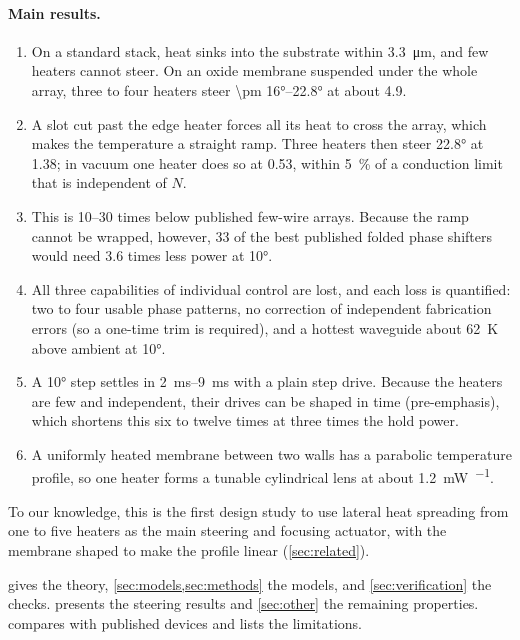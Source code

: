 \paragraph{Main results.}
\begin{enumerate}
  \item On a standard stack, heat sinks into the substrate within \qty{3.3}{\micro\metre}, and few heaters cannot
        steer. On an oxide membrane suspended under the whole array, three to four heaters steer
        \ang{\pm 16}--\ang{22.8} at about \qty{4.9}{\mWdeg}.
  \item A slot cut past the edge heater forces all its heat to cross the array, which makes the temperature a
        straight ramp. Three heaters then steer \ang{22.8} at \qty{1.38}{\mWdeg}; in vacuum one heater does so at
        \qty{0.53}{\mWdeg}, within \qty{5}{\percent} of a conduction limit that is independent of $N$.
  \item This is \numrange{10}{30} times below published few-wire arrays. Because the ramp cannot be wrapped,
        however, \num{33} of the best published folded phase shifters would need \num{3.6} times less power at
        \ang{10}.
  \item All three capabilities of individual control are lost, and each loss is quantified: two to four usable
        phase patterns, no correction of independent fabrication errors (so a one-time trim is required), and a
        hottest waveguide about \qty{62}{\kelvin} above ambient at \ang{10}.
  \item A \ang{10} step settles in \qtyrange{2}{9}{\milli\second} with a plain step drive. Because the heaters are
        few and independent, their drives can be shaped in time (pre-emphasis), which shortens this six to
        twelve times at three times the hold power.
  \item A uniformly heated membrane between two walls has a parabolic temperature profile, so one heater forms a
        tunable cylindrical lens at about \qty{1.2}{\milli\watt\per\rad}.
\end{enumerate}

To our knowledge, this is the first design study to use lateral heat spreading from one to five heaters as the
main steering and focusing actuator, with the membrane shaped to make the profile linear (\cref{sec:related}).

 gives the theory, \cref{sec:models,sec:methods} the models, and \cref{sec:verification} the
checks.  presents the steering results and \cref{sec:other} the remaining properties.
 compares with published devices and lists the limitations.
